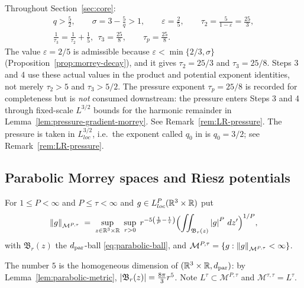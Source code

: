 \documentclass[11pt,reqno]{amsart}
\begin{document}
\begin{convention}\label{conv:step-params}
Throughout Section~\ref{sec:core}:
\begin{equation}\label{eq:standing}\begin{gathered}
  q>\tfrac52,\qquad \sigma=3-\tfrac5q>1,\qquad
  \varepsilon=\tfrac25,\qquad
  \tau_{2}=\frac{5}{1-\varepsilon}=\frac{25}{3},\\
  \frac1{\tau_{3}}=\frac1{\tau_{2}}+\frac15,\ \ \tau_{3}=\frac{25}{8},
  \qquad \tau_{p}=\frac{25}{8}.
\end{gathered}\end{equation}
The value $\varepsilon=2/5$ is admissible because
$\varepsilon<\min\{2/3,\sigma\}$ (Proposition~\ref{prop:morrey-decay}), and it
gives $\tau_{2}=25/3$ and $\tau_{3}=25/8$.
Steps 3 and 4 use these actual values in the product and potential
exponent identities, not merely $\tau_2>5$ and $\tau_3>5/2$. The pressure exponent $\tau_{p}=25/8$ is recorded for
completeness but is \emph{not} consumed downstream: the pressure enters Steps 3
and 4 through fixed-scale $L^{3/2}$ bounds for the harmonic remainder
in Lemma~\ref{lem:pressure-gradient-morrey}. See
Remark~\ref{rem:LR-pressure}. The pressure is taken in
$L^{3/2}_{loc}$, i.e.\ the exponent called $q_{0}$ in
\cite{LemarieRieusset2016} is $q_{0}=3/2$; see Remark~\ref{rem:LR-pressure}.
\end{convention}

\subsection{Parabolic Morrey spaces and Riesz potentials}\label{ss:morrey}

\begin{definition}\label{def:parabolic-morrey}
For $1\le P<\infty$ and $P\le\tau<\infty$ and $g\in L^{P}_{loc}(\mathbb{R}^{3}\times\mathbb{R})$
put
\begin{equation}\label{eq:morrey-norm}
  \left\lVert g \right\rVert_{\mathcal{M}^{P,\tau}}
  \;=\;\sup_{z\in\mathbb{R}^{3}\times\mathbb{R}}\ \sup_{r>0}\;
    r^{-5\left(\frac1P-\frac1\tau\right)}
    \Bigl(\iint_{\mathfrak{B}_{r}(z)}\left\lvert g \right\rvert^{P}\,dz'\Bigr)^{1/P},
\end{equation}
with $\mathfrak{B}_{r}(z)$ the $d_{\mathrm{par}}$-ball \eqref{eq:parabolic-ball}, and
$\mathcal{M}^{P,\tau}=\{g:\left\lVert g \right\rVert_{\mathcal{M}^{P,\tau}}<\infty\}$.
\end{definition}

The number $5$ is the homogeneous dimension of $(\mathbb{R}^{3}\times\mathbb{R},d_{\mathrm{par}})$: by
Lemma~\ref{lem:parabolic-metric},
$\left\lvert \mathfrak{B}_{r}(z) \right\rvert=\tfrac{8\pi}{3}r^{5}$. Note
$L^{\tau}\subset\mathcal{M}^{P,\tau}$ and
$\mathcal{M}^{\tau,\tau}=L^{\tau}$.
\end{document}
